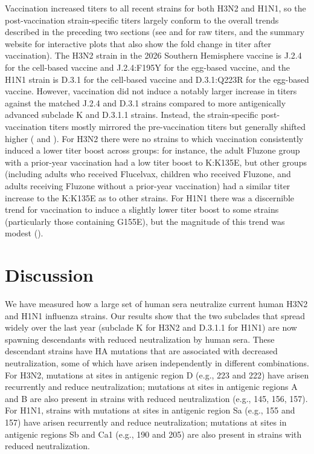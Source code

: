 Vaccination increased titers to all recent strains for both H3N2 and H1N1, so the post-vaccination strain-specific titers largely conform to the overall trends described in the preceding two sections (see \textbf{} and \textbf{} for raw titers, and the summary website for interactive plots that also show the fold change in titer after vaccination). The H3N2 strain in the 2026 Southern Hemisphere vaccine is J.2.4 for the cell-based vaccine and J.2.4:F195Y for the egg-based vaccine, and the H1N1 strain is D.3.1 for the cell-based vaccine and D.3.1:Q223R for the egg-based vaccine. However, vaccination did not induce a notably larger increase in titers against the matched J.2.4 and D.3.1 strains compared to more antigenically advanced subclade K and D.3.1.1 strains. Instead, the strain-specific post-vaccination titers mostly mirrored the pre-vaccination titers but generally shifted higher (\textbf{} and \textbf{}). For H3N2 there were no strains to which vaccination consistently induced a lower titer boost across groups: for instance, the adult Fluzone group with a prior-year vaccination had a low titer boost to K:K135E, but other groups (including adults who received Flucelvax, children who received Fluzone, and adults receiving Fluzone without a prior-year vaccination) had a similar titer increase to the K:K135E as to other strains. For H1N1 there was a discernible trend for vaccination to induce a slightly lower titer boost to some strains (particularly those containing G155E), but the magnitude of this trend was modest (\textbf{}).

\section{Discussion}

We have measured how a large set of human sera neutralize current human H3N2 and H1N1 influenza strains. Our results show that the two subclades that spread widely over the last year (subclade K for H3N2 and D.3.1.1 for H1N1) are now spawning descendants with reduced neutralization by human sera. These descendant strains have HA mutations that are associated with decreased neutralization, some of which have arisen independently in different combinations. For H3N2, mutations at sites in antigenic region D (e.g., 223 and 222) have arisen recurrently and reduce neutralization; mutations at sites in antigenic regions A and B are also present in strains with reduced neutralization (e.g., 145, 156, 157). For H1N1, strains with mutations at sites in antigenic region Sa (e.g., 155 and 157) have arisen recurrently and reduce neutralization; mutations at sites in antigenic regions Sb and Ca1 (e.g., 190 and 205) are also present in strains with reduced neutralization.

